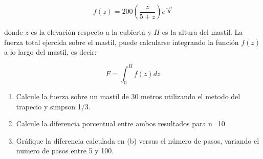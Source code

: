 \documentclass[a4paper,11pt]{article}
\theoremstyle{mytheor}
\begin{document}
\begin{enumerate}
\begin{equation*}
f(z)=200\left(\dfrac{z}{5+z}\right)e^{\tfrac{-2z}{H}}   
\end{equation*}


\noindent donde $z$ es la elevación respecto a la cubierta y $H$ es la altura del mastil. La fuerza total ejercida sobre el mastil, puede calcularse integrando la función $f(z)$ a lo largo del mastil, es decir:

\begin{equation*}
    F=\int_{0}^{H}f(z)dz
\end{equation*}

\begin{enumerate}[label=\alph*)]
    \item Calcule la fuerza sobre un mastil de 30 metros utilizando el metodo del trapecio y simpson 1/3. 
    \item Calcule la diferencia porcentual entre ambos resultados para n=10
    \item Gráfique la diferencia calculada en (b) versus el número de pasos, variando el numero de pasos entre 5 y 100.
\end{enumerate} 

\end{enumerate}
\end{document}
